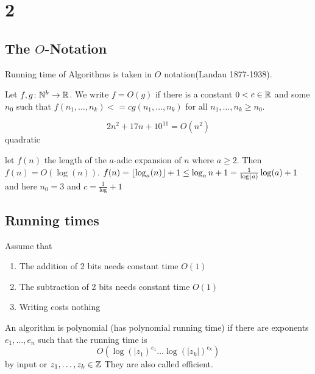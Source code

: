 \chapter{2}
\section{The \(O\)-Notation}
Running time of Algorithms is taken in \(O\) notation(Landau 1877-1938).
\begin{Def} Let \(f,g\colon \mathbb{N}^k\to\mathbb{R}\). We write 
\(f=O(g)\) if there is a constant \(0<c\in\mathbb{R}\) and some \(n_0\) such that \(f(n_1,\dots,n_k)<=cg(n_1,\dots,n_k)\) for all \(n_1,\dots,n_k\geq n_0\).
\end{Def}
\begin{Bsp} \[2n^2+17n+10^{11}=O(n^2)\] quadratic 
\end{Bsp}
\begin{Bsp}
let \(f(n)\) the length of the \(a\)-adic expansion of \(n\) where \(a\geq 2\).
Then \(f(n)=O(\log(n))\).
\(f(n)=\lfloor\log_a(n)\rfloor+1\leq \log_an+1=\frac{1}{\log(a)}\log(a)+1\) and here \(n_0=3\) and \(c=\frac{1}{\log }+1\)
\end{Bsp}

\section{Running times}
Assume that 
\begin{enumerate}
\item The addition of 2 bits needs constant time \(O(1)\)
\item The subtraction of 2 bits needs constant time \(O(1)\)
\item Writing costs nothing
\end{enumerate}
\begin{Def} An algorithm is polynomial (has polynomial running time) if there are exponents \(e_1,\dots,e_n\) such that the running time is \[O(\log(|z_1)^{e_1}\dots\log(|z_k|)^{e_k})\] by input or \(z_1,\dots,z_k\in \mathbb{Z}\) They are also called efficient.
\end{Def}

